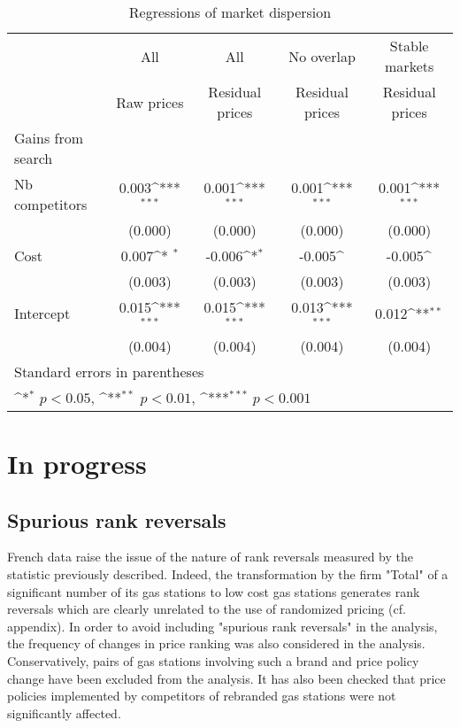 \documentclass[english]{article}
\begin{document}
{\begin{table}[!h]
\def\sym#1{\ifmmode^{#1}\else\(^{#1}\)\fi}
\caption{Regressions of market dispersion}
\centering
\begin{tabular}{lcccc}
\hline
\hline
{} & All & All & No overlap & Stable markets\\
{} & Raw prices & Residual prices & Residual prices &  Residual prices \\
\hline
Gains from search & & & & \\
\hline
Nb competitors           &  0.003\sym{***}  &  0.001\sym{***}  &  0.001\sym{***}  & 0.001\sym{***} \\
{}                       & (0.000)          & (0.000)          & (0.000)          & (0.000)        \\
Cost                     &  0.007\sym{*  }  & -0.006\sym{*}    & -0.005\sym{}     & -0.005\sym{}   \\
{}                       & (0.003)          & (0.003)          & (0.003)          & (0.003)        \\
Intercept                &  0.015\sym{***}  &  0.015\sym{***}  & 0.013\sym{***}   &  0.012\sym{**} \\
{}                       & (0.004)          & (0.004)          & (0.004)          & (0.004)        \\
\hline
\hline\hline
\multicolumn{4}{l}{\footnotesize Standard errors in parentheses}\\
\multicolumn{4}{l}{\footnotesize \sym{*} \(p<0.05\), \sym{**} \(p<0.01\), \sym{***} \(p<0.001\)}\\
\end{tabular}
\end{table}

\newpage

\section{In progress}

\subsection{Spurious rank reversals}

French data raise the issue of the nature of rank reversals measured by the statistic previously described. Indeed, the transformation by the firm "Total" of a significant number of its gas stations to low cost gas stations generates rank reversals which are clearly unrelated to the use of randomized pricing (cf. appendix). In order to avoid including "spurious rank reversals" in the analysis, the frequency of changes in price ranking was also considered in the analysis. Conservatively, pairs of gas stations involving such a brand and price policy change have been excluded from the analysis. It has also been checked that price policies implemented by competitors of rebranded gas stations were not significantly affected.

}
\end{document}

